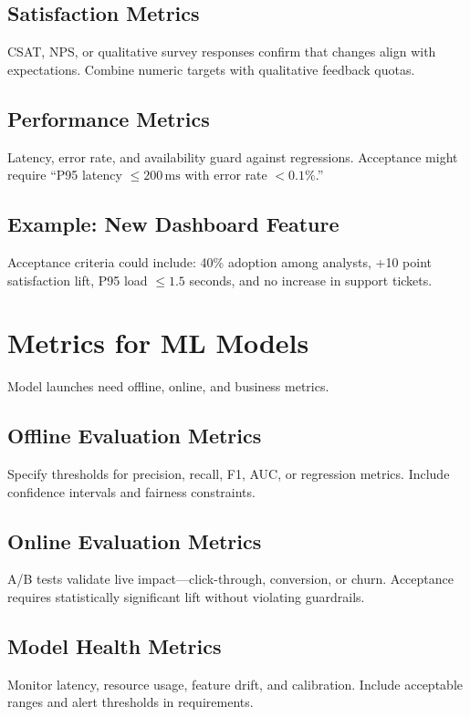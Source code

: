 \subsection{Satisfaction Metrics}
CSAT, NPS, or qualitative survey responses confirm that changes align with expectations. Combine numeric targets with qualitative feedback quotas.

\subsection{Performance Metrics}
Latency, error rate, and availability guard against regressions. Acceptance might require ``P95 latency $\le 200\,\text{ms}$ with error rate $<0.1\%$.''

\subsection{Example: New Dashboard Feature}
Acceptance criteria could include: 40\% adoption among analysts, +10 point satisfaction lift, P95 load $\le 1.5$ seconds, and no increase in support tickets.

\section{Metrics for ML Models}
\label{sec:ml-metrics}

Model launches need offline, online, and business metrics.

\subsection{Offline Evaluation Metrics}
Specify thresholds for precision, recall, F1, AUC, or regression metrics. Include confidence intervals and fairness constraints.

\subsection{Online Evaluation Metrics}
A/B tests validate live impact—click-through, conversion, or churn. Acceptance requires statistically significant lift without violating guardrails.

\subsection{Model Health Metrics}
Monitor latency, resource usage, feature drift, and calibration. Include acceptable ranges and alert thresholds in requirements.

